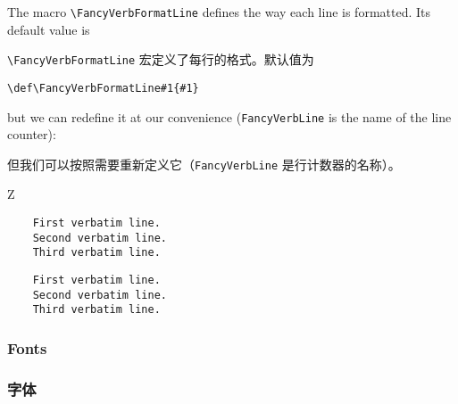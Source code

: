 \documentclass[twoside]{article}
\newcommand\cs[1]{\texttt{\textbackslash#1}}
\newcommand\verbatimTxt{抄录}
\begin{document}
% \begin{parcolumns}[rulebetween=true,colwidths={1=.6\linewidth}]{2}

The macro \cs{FancyVerbFormatLine} defines the way each line is formatted.
Its default value is

\cs{FancyVerbFormatLine} 宏定义了每行的格式。默认值为

\verb+\def\FancyVerbFormatLine#1{#1}+

but we can
redefine it at our convenience (\texttt{FancyVerbLine} is the name of the
line counter):

但我们可以按照需要重新定义它（\texttt{FancyVerbLine} 是行计数器的名称）。


{
\begin{SideBySideExample}
  Z
  \renewcommand{\FancyVerbFormatLine}[1]{%
    \makebox[0cm][l]{$\Rightarrow$}#1}
  \begin{Verbatim}
    First verbatim line.
    Second verbatim line.
    Third verbatim line.
  \end{Verbatim}
\end{SideBySideExample}

\begin{SideBySideExample}
  \renewcommand{\FancyVerbFormatLine}[1]{%
    \ifodd\value{FancyVerbLine}%
      \MakeUppercase{#1}\else#1\fi}
  \begin{Verbatim}
    First verbatim line.
    Second verbatim line.
    Third verbatim line.
  \end{Verbatim}
\end{SideBySideExample}
}

\subsubsection{Fonts}
\subsubsection{字体}
\end{document}
